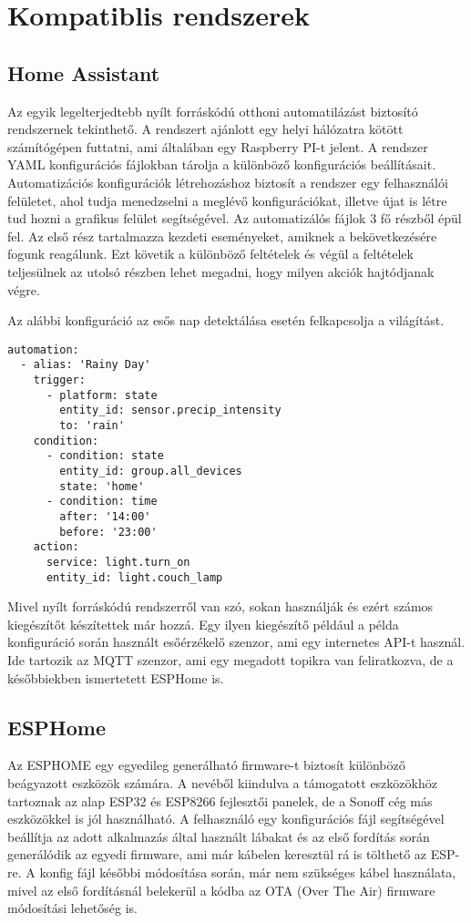 \chapter{Kompatiblis rendszerek}


\section{Home Assistant}
Az egyik legelterjedtebb nyílt forráskódú otthoni automatilázást biztosító rendszernek tekinthető. A rendszert ajánlott egy helyi hálózatra kötött számítógépen futtatni, ami általában egy Raspberry PI-t jelent.
A rendszer YAML konfigurációs fájlokban tárolja a különböző konfigurációs beállításait. Automatizációs konfigurációk létrehozáshoz biztosít a rendszer egy felhasználói felületet, ahol tudja menedzselni a meglévő konfigurációkat, illetve újat is létre tud hozni a grafikus felület segítségével. 
Az automatizálós fájlok 3 fő részből épül fel. Az első rész tartalmazza kezdeti eseményeket, amiknek a bekövetkezésére fogunk reagálunk. Ezt követik a különböző feltételek és végül a feltételek teljesülnek az utolsó részben lehet megadni, hogy milyen akciók hajtódjanak végre.

Az alábbi konfiguráció az esős nap detektálása esetén felkapcsolja a világítást. \cite{homeassist:online}
\begin{lstlisting}
automation:
  - alias: 'Rainy Day'
    trigger:
      - platform: state
        entity_id: sensor.precip_intensity
        to: 'rain'
    condition:
      - condition: state
        entity_id: group.all_devices
        state: 'home'
      - condition: time
        after: '14:00'
        before: '23:00'
    action:
      service: light.turn_on
      entity_id: light.couch_lamp
\end{lstlisting}

Mivel nyílt forráskódú rendszerről van szó, sokan használják és ezért számos kiegészítőt készítettek már hozzá. Egy ilyen kiegészítő például a példa konfiguráció során használt esőérzékelő szenzor, ami egy internetes API-t használ. Ide tartozik az MQTT szenzor, ami egy megadott topikra van feliratkozva, de a későbbiekben ismertetett ESPHome is.


\clearpage

\section{ESPHome}
Az ESPHOME egy egyedileg generálható firmware-t biztosít különböző beágyazott eszközök számára. A nevéből kiindulva a támogatott eszközökhöz tartoznak az alap ESP32 és ESP8266 fejlesztői panelek, de a Sonoff cég más eszközökkel is jól használható.
A felhasználó egy konfigurációs fájl segítségével beállítja az adott alkalmazás által használt lábakat és az első fordítás során generálódik az egyedi firmware, ami már kábelen keresztül rá is tölthető az ESP-re. A konfig fájl későbbi módosítása során, már nem szükséges kábel használata, mivel az első fordításnál belekerül a kódba az OTA (Over The Air) firmware módosítási lehetőség is.


